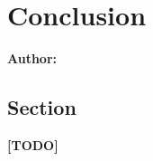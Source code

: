 \chapter{Conclusion}

\textbf{Author: } 

\section{Section}
\textbf{[TODO]}
\newline
\lipsum[1]

\filbreak
